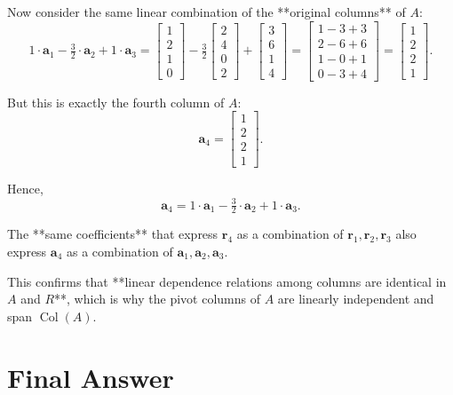 \documentclass{article}
\begin{document}
Now consider the same linear combination of the **original columns** of $A$:
\[
1\cdot\mathbf{a}_1 - \tfrac{3}{2}\cdot\mathbf{a}_2 + 1\cdot\mathbf{a}_3
= 
\begin{bmatrix}1\\2\\1\\0\end{bmatrix}
- \tfrac{3}{2}\begin{bmatrix}2\\4\\0\\2\end{bmatrix}
+ \begin{bmatrix}3\\6\\1\\4\end{bmatrix}
=
\begin{bmatrix}
1 - 3 + 3 \\
2 - 6 + 6 \\
1 - 0 + 1 \\
0 - 3 + 4
\end{bmatrix}
=
\begin{bmatrix}
1 \\ 2 \\ 2 \\ 1
\end{bmatrix}.
\]

But this is exactly the fourth column of $A$:
\[
\mathbf{a}_4 = \begin{bmatrix}1\\2\\2\\1\end{bmatrix}.
\]

Hence,
\[
\mathbf{a}_4 = 1\cdot\mathbf{a}_1 - \tfrac{3}{2}\cdot\mathbf{a}_2 + 1\cdot\mathbf{a}_3.
\]

The **same coefficients** that express $\mathbf{r}_4$ as a combination of $\mathbf{r}_1,\mathbf{r}_2,\mathbf{r}_3$ also express $\mathbf{a}_4$ as a combination of $\mathbf{a}_1,\mathbf{a}_2,\mathbf{a}_3$.

This confirms that **linear dependence relations among columns are identical in $A$ and $R$**, which is why the pivot columns of $A$ are linearly independent and span $\operatorname{Col}(A)$.


\section*{Final Answer}
\end{document}
